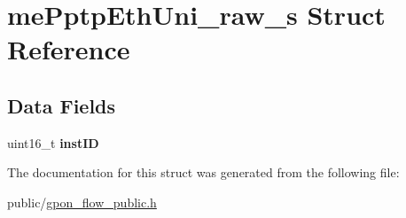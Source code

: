 \hypertarget{structmePptpEthUni__raw__s}{}\section{me\+Pptp\+Eth\+Uni\+\_\+raw\+\_\+s Struct Reference}
\label{structmePptpEthUni__raw__s}
\subsection*{Data Fields}
\begin{DoxyCompactItemize}
\item 
\mbox{\label{structmePptpEthUni__raw__s_a0d1e2d2dbfb5c4f6577c1eaa838e1a5b}} 
uint16\+\_\+t {\bfseries inst\+ID}
\end{DoxyCompactItemize}


The documentation for this struct was generated from the following file\+:\begin{DoxyCompactItemize}
\item 
public/\hyperlink{gpon__flow__public_8h}{gpon\+\_\+flow\+\_\+public.\+h}\end{DoxyCompactItemize}
